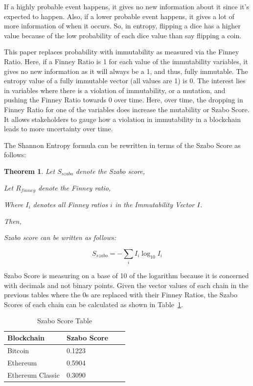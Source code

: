 \documentclass{article}
\newtheorem{theorem}{Theorem}
\begin{document}
If a highly probable event happens, it gives no new information about it since it’s expected to happen. Also, if a lower probable event happens, it gives a lot of more information of when it occurs. So, in entropy, flipping a dice has a higher value because of the low probability of each dice value than say flipping a coin.

This paper replaces probability with immutability as measured via the Finney Ratio. Here, if a Finney Ratio is 1 for each value of the immutability variables, it gives no new information as it will always be a 1, and thus, fully immutable. The entropy value of a fully immutable vector (all values are 1) is 0. The interest lies in variables where there is a violation of immutability, or a mutation, and pushing the Finney Ratio towards 0 over time. Here, over time, the dropping in Finney Ratio for one of the variables does increase the mutability or Szabo Score. It allows stakeholders to gauge how a violation in immutability in a blockchain leads to more uncertainty over time.

The Shannon Entropy\cite{entropy} formula can be rewritten in terms of the Szabo Score as follows:

\begin{theorem}
Let $S_{szabo}$ denote the Szabo score,

Let $R$$_{finney}$ denote the Finney ratio,

Where $I_{i}$ denotes all Finney ratios $i$ in the Immutability
Vector $\emph{I}$.

Then,

Szabo score can be written as follows:

\begin{equation}
    S_{szabo}=-\sum_{i}I_{i}\log_{10}I_{i}
\end{equation}
\end{theorem}

Szabo Score is measuring on a base of 10 of the logarithm because it is concerned with decimals and not binary points. Given the vector values of each chain in the previous tables where the 0s are replaced with their Finney Ratios, the Szabo Scores of each chain can be calculated as shown in Table~\ref{tab6:table}.

\begin{table}
 \caption{Szabo Score Table}
  \centering
  \begin{tabular}{llll}
    \toprule
    \cmidrule(r){1-2}
    Blockchain & Szabo Score \\
    \midrule
    Bitcoin & 0.1223 \\
    Ethereum & 0.5904 \\
    Ethereum Classic & 0.3090 \\
    \bottomrule
  \end{tabular}
  \label{tab6:table}
\end{table}
\end{document}

